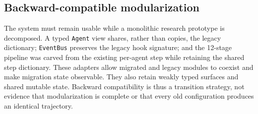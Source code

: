 \subsection{Backward-compatible modularization}

The system must remain usable while a monolithic research prototype is
decomposed.  A typed \texttt{Agent} view shares, rather than copies, the legacy
dictionary; \texttt{EventBus} preserves the legacy hook signature; and the
12-stage pipeline was carved from the existing per-agent step while retaining
the shared step dictionary.  These adapters allow migrated and legacy modules
to coexist and make migration state observable.  They also retain weakly typed
surfaces and shared mutable state.  Backward compatibility is thus a transition
strategy, not evidence that modularization is complete or that every old
configuration produces an identical trajectory.
